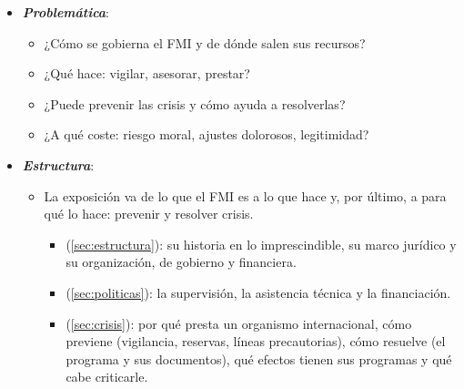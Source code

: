 \documentclass[11pt]{article}
\begin{document}
\begin{itemize}
\item \textbf{\emph{Problemática}}:
  \begin{itemize}
  \item ¿Cómo se gobierna el FMI y de dónde salen sus recursos?
  \item ¿Qué hace: vigilar, asesorar, prestar?
  \item ¿Puede prevenir las crisis y cómo ayuda a resolverlas?
  \item ¿A qué coste: riesgo moral, ajustes dolorosos, legitimidad?
  \end{itemize}

\item \textbf{\emph{Estructura}}:
  \begin{itemize}
  \item La exposición va de lo que el FMI es a lo que hace y, por último, a para qué lo hace: prevenir y resolver crisis.
    \begin{itemize}
    \item {} (\ref{sec:estructura}): su historia en lo imprescindible, su marco jurídico y su organización, de gobierno y financiera.
    \item {} (\ref{sec:politicas}): la supervisión, la asistencia técnica y la financiación.
    \item {} (\ref{sec:crisis}): por qué presta un organismo internacional, cómo previene (vigilancia, reservas, líneas precautorias), cómo resuelve (el programa y sus documentos), qué efectos tienen sus programas y qué cabe criticarle.
    \end{itemize}
  \end{itemize}
\end{itemize}
\end{document}
